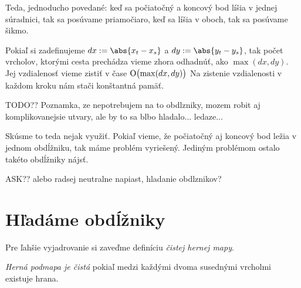 Teda, jednoducho povedané: keď sa počiatočný a koncový bod líšia v jednej súradnici, tak sa posúvame priamočiaro,
keď sa líšia v oboch, tak sa posúvame šikmo.

Pokiaľ si zadefinujeme $dx := \abs{x_t - x_s}$ a $dy := \abs{y_t - y_s}$, tak počet vrcholov,
ktorými cesta prechádza vieme zhora odhadnúť, ako $\max(dx, dy)$. Jej vzdialenosť vieme zistiť v čase  $\operatorname{O}\bigl(\max(dx, dy)\bigr)$
Na zistenie vzdialenosti v každom kroku nám stači konštantná pamäť.

TODO?? Poznamka, ze nepotrebujem na to obdlzniky, mozem robit aj komplikovanejsie utvary, ale by to sa blbo hladalo... ledaze...

Skúsme to teda nejak využiť. Pokiaľ vieme, že počiatočný aj koncový bod ležia v jednom obdĺžniku, tak máme problém vyriešený. 
Jediným problémom ostalo takéto obdĺžniky nájsť. 


ASK?? alebo radsej neutralne napiast, hladanie obdlznikov?
\section{Hľadáme obdĺžniky}
Pre ľahšie vyjadrovanie si zaveďme definíciu {\sl čistej hernej mapy}.

\begin{define}
{\sl Herná podmapa je čistá} 
pokiaľ medzi každými dvoma susednými vrcholmi existuje hrana.
\end{define}

